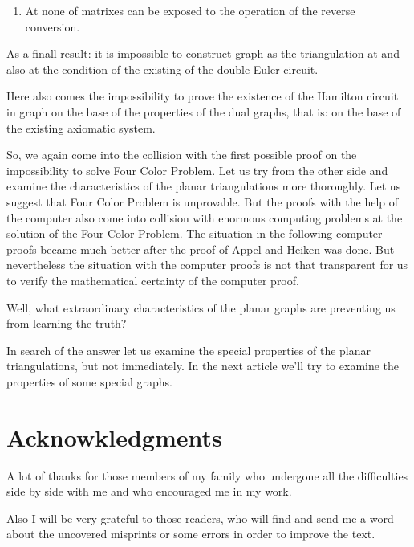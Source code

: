 \documentclass{amsart}
\theoremstyle{plain}
\numberwithin{equation}{section}
\begin{document}
\begin{enumerate}
\item 
At  none of matrixes  can be exposed to the operation of the reverse conversion. 
\end{enumerate}

As a finall result: it is impossible to construct graph  as the triangulation  at  and also at the condition of the existing of the double Euler circuit.

Here also comes the impossibility to prove the existence of the Hamilton circuit in graph  on the base of the properties of the dual graphs, that is: on the base of the existing axiomatic system. 

So, we again come into the collision with the first possible proof on the impossibility to solve Four Color Problem. Let us try from the other side and examine the characteristics of the planar triangulations more thoroughly. Let us suggest that Four Color Problem is unprovable. But the proofs with the help of the computer also come into collision with enormous computing problems at the solution of the Four Color Problem. The situation in the following computer proofs became much better after the proof of Appel and Heiken was done. But nevertheless the situation with the computer proofs is not that transparent for us to verify the mathematical certainty of the computer proof.

Well, what extraordinary characteristics of the planar graphs are preventing us from learning the truth? 

In search of the answer let us examine the special properties of the planar triangulations, but not immediately. In the next article we'll try to examine the properties of some special graphs.

\section {Acknowkledgments}

A lot of thanks for those members of my family who undergone all the difficulties side by side with me and who encouraged me in my work.  

Also I will be very grateful to those readers, who will find and send me a word about the uncovered misprints or some errors in order to improve the text. 
\end{document}
